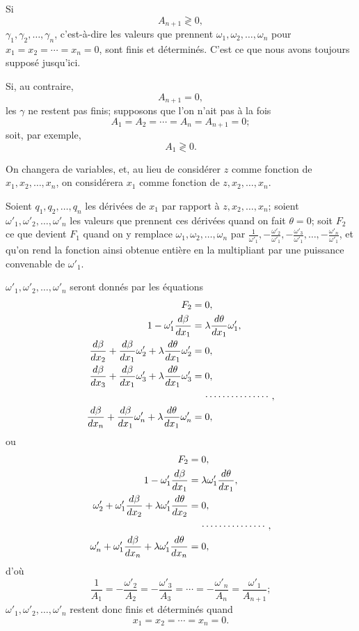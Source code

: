 \documentclass[11pt]{article}
\begin{document}
Si
\[
A_{n+1}\gtrless0,
\]
$\gamma_1,\gamma_2,\ldots,\gamma_n$, c’est-à-dire les valeurs que prennent $\omega_1,\omega_2,\ldots,\omega_n$ pour $x_1=x_2=\cdots=x_n=0$, sont finis et déterminés. C’est ce que nous avons toujours supposé jusqu’ici.

Si, au contraire,
\[
A_{n+1}=0,
\]
les $\gamma$ ne restent pas finis; supposons que l’on n’ait pas à la fois
\[
A_1=A_2=\cdots=A_n=A_{n+1}=0;
\]
soit, par exemple,
\[
A_1\gtrless0.
\]

On changera de variables, et, au lieu de considérer $z$ comme fonction de $x_1,x_2,\ldots,x_n$, on considérera $x_1$ comme fonction de $z,x_2,\ldots,x_n$.

Soient $q_1,q_2,\ldots,q_n$ les dérivées de $x_1$ par rapport à $z,x_2,\ldots,x_n$; soient $\omega'_1,\omega'_2,\ldots,\omega'_n$ les valeurs que prennent ces dérivées quand on fait $\theta=0$; soit $F_2$ ce que devient $F_1$ quand on y remplace $\omega_1,\omega_2,\ldots,\omega_n$ par $\frac{1}{\omega'_1},-\frac{\omega'_2}{\omega'_1},-\frac{\omega'_3}{\omega'_1},\ldots,-\frac{\omega'_n}{\omega'_1}$, et qu’on rend la fonction ainsi obtenue entière en la multipliant par une puissance convenable de $\omega'_1$.

$\omega'_1,\omega'_2,\ldots,\omega'_n$ seront donnés par les équations
\[
\begin{aligned}
F_2&=0,\\
1-\omega'_1\frac{d\beta}{dx_1}&=\lambda\frac{d\theta}{dx_1}\omega'_1,\\
\frac{d\beta}{dx_2}+\frac{d\beta}{dx_1}\omega'_2+\lambda\frac{d\theta}{dx_1}\omega'_2&=0,\\
\frac{d\beta}{dx_3}+\frac{d\beta}{dx_1}\omega'_3+\lambda\frac{d\theta}{dx_1}\omega'_3&=0,\\
&\hspace{1.2em}\cdots\cdots\cdots\cdots\cdots,\\
\frac{d\beta}{dx_n}+\frac{d\beta}{dx_1}\omega'_n+\lambda\frac{d\theta}{dx_1}\omega'_n&=0,
\end{aligned}
\]
ou
\[
\begin{aligned}
F_2&=0,\\
1-\omega'_1\frac{d\beta}{dx_1}&=\lambda\omega'_1\frac{d\theta}{dx_1},\\
\omega'_2+\omega'_1\frac{d\beta}{dx_2}+\lambda\omega'_1\frac{d\theta}{dx_2}&=0,\\
&\hspace{1.2em}\cdots\cdots\cdots\cdots\cdots,\\
\omega'_n+\omega'_1\frac{d\beta}{dx_n}+\lambda\omega'_1\frac{d\theta}{dx_n}&=0,
\end{aligned}
\]
d’où
\[
\frac{1}{A_1}
=
-\frac{\omega'_2}{A_2}
=
-\frac{\omega'_3}{A_3}
=\cdots=
-\frac{\omega'_n}{A_n}
=
\frac{\omega'_1}{A_{n+1}};
\]
$\omega'_1,\omega'_2,\ldots,\omega'_n$ restent donc finis et déterminés quand
\[
x_1=x_2=\cdots=x_n=0.
\]
\end{document}
